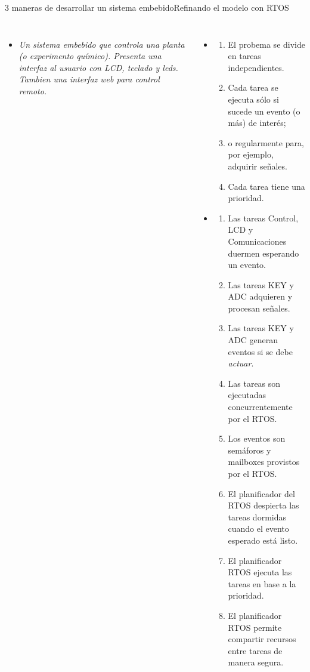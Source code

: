 \documentclass[8pt,aspectratio=169,compress]{beamer}
\begin{document}
\begin{frame}{3 maneras de desarrollar un sistema embebido}{Refinando el modelo con RTOS}


    \begin{columns}[onlytextwidth,T]
      \column{\dimexpr\linewidth-60mm-5mm}

\begin{itemize}
\item [Ejemplo] \textit{Un sistema embebido que controla una planta (o experimento químico). Presenta una interfaz al usuario con LCD, teclado y leds. Tambien una interfaz web para control remoto.}
\end{itemize}

\begin{itemize}

\item [Diseño]

\begin{enumerate}
\item El probema se divide en tareas independientes.
\item Cada tarea se ejecuta sólo si sucede un evento (o más) de interés;
\item o regularmente para, por ejemplo, adquirir señales.
\item Cada tarea tiene una prioridad.
\end{enumerate}


\bigskip

\item [RTOS]
\begin{enumerate}
\item Las tareas Control, LCD y Comunicaciones duermen esperando un evento.
\item Las tareas KEY y ADC adquieren y procesan señales.
\item Las tareas KEY y ADC generan eventos si se debe \textit{actuar}.
\item Las tareas son ejecutadas concurrentemente por el RTOS.
\item Los eventos son semáforos y mailboxes provistos por el RTOS.
\item El planificador del RTOS despierta las tareas dormidas cuando el evento esperado está listo.
\item El planificador RTOS ejecuta las tareas en base a la prioridad.
\item El planificador RTOS permite compartir recursos entre tareas de manera segura.
\end{enumerate}



\end{itemize}
\end{columns}
\end{frame}
\end{document}
